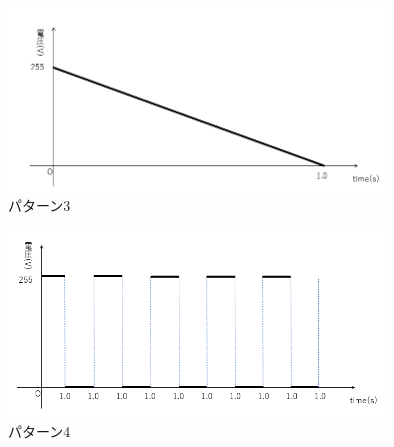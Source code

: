 \begin{figure}[h]
\centering
\includegraphics[clip,width=10cm]{./fig/patarn3.png}
\caption{パターン3}\label{patarn3}
\end{figure}

\begin{figure}[h]
\centering
\includegraphics[clip,width=10cm]{./fig/patarn4.png}
\caption{パターン4}\label{patarn4}
\end{figure}


